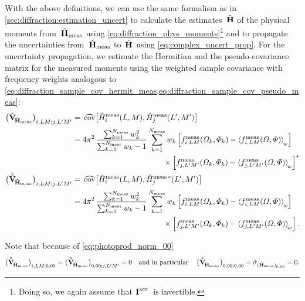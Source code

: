 With the above definitions, we can use the same formalism as in
\cref{sec:diffraction:estimation_uncert} to calculate the
estimates~$\hat{\bm{\mathrm{H}}}$ of the physical moments
from~$\hat{\bm{\mathrm{H}}}_\text{meas}$ using
\cref{eq:diffraction_phys_moments}\footnote{Doing so, we again assume
that $\bm{\mathrm{I}}^\text{acc}$~is invertible.} and to propagate the
uncertainties from~$\hat{\bm{\mathrm{H}}}_\text{meas}$ to~$\hat{\bm{\mathrm{H}}}$
using \cref{eq:complex_uncert_prop}.  For the uncertainty propagation,
we estimate the Hermitian and the pseudo-covariance matrix for the
measured moments using the weighted sample covariance with frequency
weights analogous to
\cref{eq:diffraction_sample_cov_hermit_meas,eq:diffraction_sample_cov_pseudo_meas}:
\begin{align}
  \rBrk[1]{\covMatEstSym_{\!\hat{\vect{H}}_\text{meas}}}_{i, L M; j, L' M'}
  ={}& \covEst[1]{\hat{H}_i^\text{meas}(L, M), \hat{H}_j^\text{meas}(L', M')} \nonumber
  \\
  \label{eq:photoprod_sample_cov_hermit_meas}
  ={}& \begin{multlined}[t][0.7\columnwidth]
    4 \pi^2\, \frac{\sum_{k = 1}^{N_\text{meas}} w_k^2}{\sum_{k = 1}^{N_\text{meas}} w_k - 1} \sum_{k = 1}^{N_\text{meas}} w_k
    \sBrk[2]{f_{i, L M}^\text{meas}(\Omega_k, \Phi_k)   - \meanWeighted{f_{i, L M}^\text{meas}(\Omega, \Phi)}}
    \\
    {} \times \sBrk[2]{f_{j, L' M'}^\text{meas}(\Omega_k, \Phi_k) - \meanWeighted{f_{j, L' M'}^\text{meas}(\Omega, \Phi)}}^*
  \end{multlined}
  \\
  \rBrk[1]{\hat{\tilde{\covMatSym}}_{\!\hat{\vect{H}}_\text{meas}}}_{i, L M; j, L' M'}
  ={}& \covEst[1]{\hat{H}_i^\text{meas}(L, M), \hat{H}_j^{\text{meas}\, *}(L', M')} \nonumber
  \\
  \label{eq:photoprod_sample_cov_pseudo_meas}
  ={}& \begin{multlined}[t][0.7\columnwidth]
    4 \pi^2\, \frac{\sum_{k = 1}^{N_\text{meas}} w_k^2}{\sum_{k = 1}^{N_\text{meas}} w_k - 1} \sum_{k = 1}^{N_\text{meas}} w_k
    \sBrk[2]{f_{i, L M}^\text{meas}(\Omega_k, \Phi_k)   - \meanWeighted{f_{i, L M}^\text{meas}(\Omega, \Phi)}}
    \\
    {} \times \sBrk[2]{f_{j, L' M'}^\text{meas}(\Omega_k, \Phi_k) - \meanWeighted{f_{j, L' M'}^\text{meas}(\Omega, \Phi)}}.
  \end{multlined}
\end{align}

Note that because of \cref{eq:photoprod_norm_00}
\begin{equation}
  \rBrk[1]{\hat{\tilde{\covMatSym}}_{\!\hat{\vect{H}}_\text{meas}}}_{i, L M; 0, 0 0}
  = \rBrk[1]{\hat{\tilde{\covMatSym}}_{\!\hat{\vect{H}}_\text{meas}}}_{0, 0 0; j, L' M'}
  = 0
  \quad\text{and in particular}\quad
  \rBrk[1]{\hat{\tilde{\covMatSym}}_{\!\hat{\vect{H}}_\text{meas}}}_{0, 0 0; 0, 0 0}
  = \hat{\sigma}_{\rBrk[0]{\hat{\vect{H}}_\text{meas}}_{0, 0 0}}
  = 0.
\end{equation}

